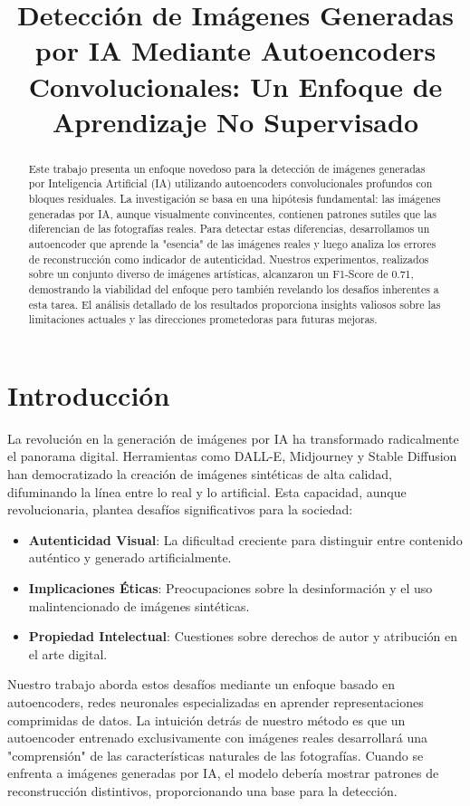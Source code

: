 \documentclass[conference]{IEEEtran}
\title{Detección de Imágenes Generadas por IA Mediante Autoencoders Convolucionales: Un Enfoque de Aprendizaje No Supervisado}
\author{
    \IEEEauthorblockN{Laboratorio de Lenguaje Natural}
    \IEEEauthorblockA{Universidad Nacional\\
    Email: ln@universidad.edu}
}
\begin{document}
\maketitle

\begin{abstract}
Este trabajo presenta un enfoque novedoso para la detección de imágenes generadas por Inteligencia Artificial (IA) utilizando autoencoders convolucionales profundos con bloques residuales. La investigación se basa en una hipótesis fundamental: las imágenes generadas por IA, aunque visualmente convincentes, contienen patrones sutiles que las diferencian de las fotografías reales. Para detectar estas diferencias, desarrollamos un autoencoder que aprende la "esencia" de las imágenes reales y luego analiza los errores de reconstrucción como indicador de autenticidad. Nuestros experimentos, realizados sobre un conjunto diverso de imágenes artísticas, alcanzaron un F1-Score de 0.71, demostrando la viabilidad del enfoque pero también revelando los desafíos inherentes a esta tarea. El análisis detallado de los resultados proporciona insights valiosos sobre las limitaciones actuales y las direcciones prometedoras para futuras mejoras.
\end{abstract}

\section{Introducción}
La revolución en la generación de imágenes por IA ha transformado radicalmente el panorama digital. Herramientas como DALL-E, Midjourney y Stable Diffusion han democratizado la creación de imágenes sintéticas de alta calidad, difuminando la línea entre lo real y lo artificial. Esta capacidad, aunque revolucionaria, plantea desafíos significativos para la sociedad:

\begin{itemize}
    \item \textbf{Autenticidad Visual}: La dificultad creciente para distinguir entre contenido auténtico y generado artificialmente.
    \item \textbf{Implicaciones Éticas}: Preocupaciones sobre la desinformación y el uso malintencionado de imágenes sintéticas.
    \item \textbf{Propiedad Intelectual}: Cuestiones sobre derechos de autor y atribución en el arte digital.
\end{itemize}

Nuestro trabajo aborda estos desafíos mediante un enfoque basado en autoencoders, redes neuronales especializadas en aprender representaciones comprimidas de datos. La intuición detrás de nuestro método es que un autoencoder entrenado exclusivamente con imágenes reales desarrollará una "comprensión" de las características naturales de las fotografías. Cuando se enfrenta a imágenes generadas por IA, el modelo debería mostrar patrones de reconstrucción distintivos, proporcionando una base para la detección.
\end{document}
